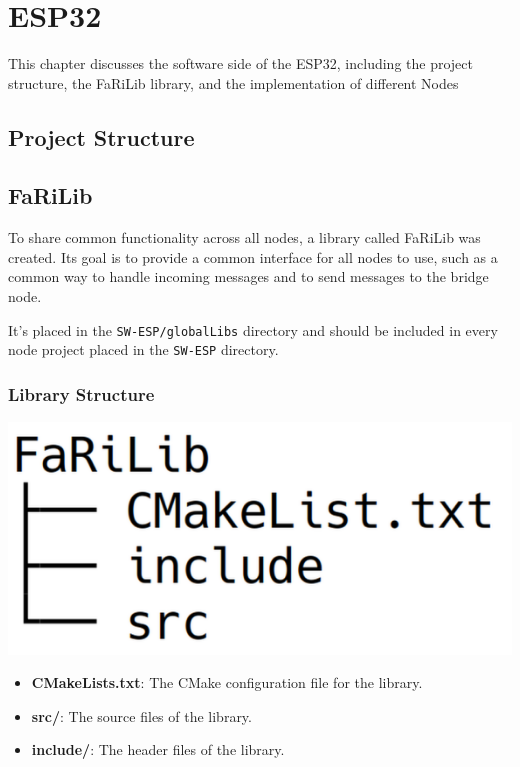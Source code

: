 \chapter{ESP32} 
This chapter discusses the software side of the ESP32,
including the project structure, the FaRiLib library, and the
implementation of different Nodes

\section{Project Structure}

\section{FaRiLib}
To share common functionality across all nodes, a library called FaRiLib was
created. Its goal is to provide a common interface for all nodes to use, such as
a common way to handle incoming messages and to send messages to the bridge node. 
\par\vspace{0.5em}
It's placed in the \texttt{SW-ESP/globalLibs} directory and should be included in
every node project placed in the \texttt{SW-ESP} directory.
    \subsection{Library Structure}
        \begin{minipage}{0.48\textwidth}
            \includegraphics[width=0.8\linewidth]{assets/FaRiLibStructure.png}
            \label{fig:farilib_structure}
        \end{minipage}%
        \begin{minipage}{0.48\textwidth}
            \raggedright
            \begin{itemize}
                \item \textbf{CMakeLists.txt}: The CMake configuration file for the 
                library.
                \item \textbf{src/}: The source files of the library.
                \item \textbf{include/}: The header files of the library.
            \end{itemize}
        \end{minipage}
